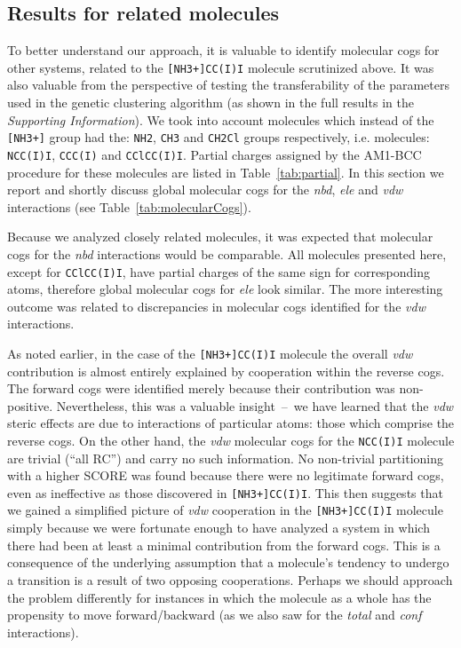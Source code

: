 \documentclass[a4paper,11pt,twoside]{book}%
\begin{document}
{\color{black}
\subsection{Results for related molecules}
To better understand our approach, it is valuable to identify molecular cogs for other systems, related to the \texttt{[NH3+]CC(I)I} molecule scrutinized above.
It was also valuable from the perspective of testing the transferability of the parameters used in the genetic clustering algorithm (as shown in the full results in the \emph{Supporting Information}).
We took into account molecules which instead of the \texttt{[NH3+]} group had the: \texttt{NH2}, \texttt{CH3} and \texttt{CH2Cl} groups respectively, i.e. molecules: \texttt{NCC(I)I}, \texttt{CCC(I)} and \texttt{CClCC(I)I}. 
Partial charges assigned by the AM1-BCC procedure for these molecules are listed in Table~\ref{tab:partial}. 
In this section we report and shortly discuss global molecular cogs for the \emph{nbd}, \emph{ele} and \emph{vdw} interactions (see Table~\ref{tab:molecularCogs}).

Because we analyzed closely related molecules, it was expected that molecular cogs for the \emph{nbd} interactions would be comparable.
All molecules presented here, except for \texttt{CClCC(I)I}, have partial charges of the same sign for corresponding atoms, therefore global molecular cogs for \emph{ele} look similar.
The more interesting outcome was related to discrepancies in molecular cogs identified for the \emph{vdw} interactions.

As noted earlier, in the case of the \texttt{[NH3+]CC(I)I} molecule the overall \emph{vdw} contribution is almost entirely explained by cooperation within the reverse cogs.
The forward cogs were identified merely because their contribution was non-positive.
Nevertheless, this was a valuable insight~--~we have learned that the \emph{vdw} steric effects are due to interactions of particular atoms: those which comprise the reverse cogs.
On the other hand, the \emph{vdw} molecular cogs for the \texttt{NCC(I)I} molecule are trivial (``all RC'') and carry no such information.
No non-trivial partitioning with a higher SCORE was found because there were no legitimate forward cogs, even as ineffective as those discovered in \texttt{[NH3+]CC(I)I}.
This then suggests that we gained a simplified picture of \emph{vdw} cooperation in the \texttt{[NH3+]CC(I)I} molecule simply because we were fortunate enough to have analyzed a system in which there had been at least a minimal contribution from the forward cogs.
This is a consequence of the underlying assumption that a molecule's tendency to undergo a transition is a result of two opposing cooperations.
Perhaps we should approach the problem differently for instances in which the molecule as a whole has the propensity to move forward/backward (as we also saw for the \emph{total} and \emph{conf} interactions).

}
\end{document}
